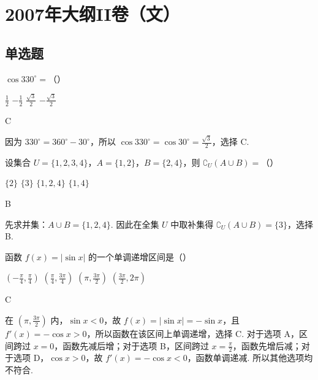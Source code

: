 \chapter{2007年大纲II卷（文）}

\section{单选题}

\begin{problem}
\(\cos 330^{\circ}=\)（\quad）

\choices
    {\(\frac{1}{2}\)}
    {\(-\frac{1}{2}\)}
    {\(\frac{\sqrt{3}}{2}\)}
    {\(-\frac{\sqrt{3}}{2}\)}
\end{problem}

\begin{answer}
C
\end{answer}

\begin{solution}
因为 \(330^{\circ}=360^{\circ}-30^{\circ}\)，所以
\(\cos 330^{\circ}=\cos 30^{\circ}=\frac{\sqrt{3}}{2}\)，选择 C.
\end{solution}

\begin{problem}
设集合 \(U=\{1,2,3,4\}\)，\(A=\{1,2\}\)，\(B=\{2,4\}\)，则 \(\complement_U(A\cup B)=\)（\quad）

\choices
    {\(\{2\}\)}
    {\(\{3\}\)}
    {\(\{1,2,4\}\)}
    {\(\{1,4\}\)}
\end{problem}

\begin{answer}
B
\end{answer}

\begin{solution}
先求并集：\(A\cup B=\{1,2,4\}\). 因此在全集 \(U\) 中取补集得
\(\complement_U(A\cup B)=\{3\}\)，选择 B.
\end{solution}

\begin{problem}
函数 \(f(x)=|\sin x|\) 的一个单调递增区间是（\quad）

\choices
    {\(\left(-\frac{\pi}{4},\frac{\pi}{4}\right)\)}
    {\(\left(\frac{\pi}{4},\frac{3\pi}{4}\right)\)}
    {\(\left(\pi,\frac{3\pi}{2}\right)\)}
    {\(\left(\frac{3\pi}{2},2\pi\right)\)}
\end{problem}

\begin{answer}
C
\end{answer}

\begin{solution}
在 \((\pi,\frac{3\pi}{2})\) 内，\(\sin x<0\)，故
\(f(x)=|\sin x|=-\sin x\)，且 \(f'(x)=-\cos x>0\)，所以函数在该区间上单调递增，选择 C.
对于选项 A，区间跨过 \(x=0\)，函数先减后增；对于选项 B，区间跨过
\(x=\frac{\pi}{2}\)，函数先增后减；对于选项 D，\(\cos x>0\)，故
\(f'(x)=-\cos x<0\)，函数单调递减. 所以其他选项均不符合.
\end{solution}

